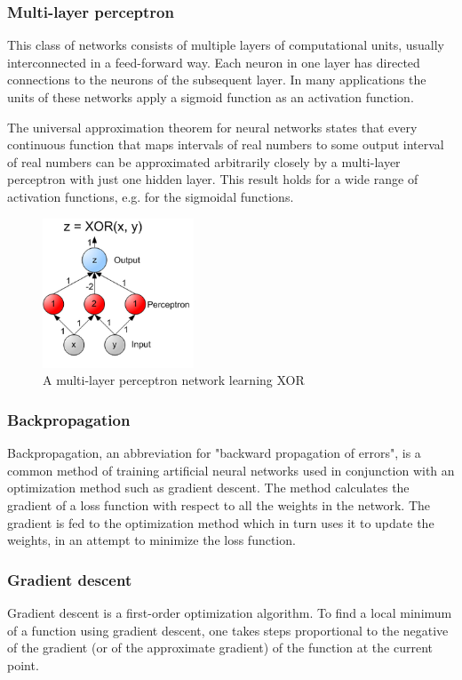 \documentclass[14pt,a4paper]{extarticle}
\begin{document}
		
		\subsubsection{Multi-layer perceptron}
		This class of networks consists of multiple layers of computational units, usually interconnected in a feed-forward way. Each neuron in one layer has directed connections to the neurons of the subsequent layer. In many applications the units of these networks apply a sigmoid function as an activation function.

The universal approximation theorem for neural networks states that every continuous function that maps intervals of real numbers to some output interval of real numbers can be approximated arbitrarily closely by a multi-layer perceptron with just one hidden layer. This result holds for a wide range of activation functions, e.g. for the sigmoidal functions.

		\begin{figure}[H]
			\includegraphics[width=0.4\textwidth, center]{XOR_perceptron_net.png}
			\caption{A multi-layer perceptron network learning XOR}
		\end{figure}
		
		
	\subsubsection{Backpropagation}
	
	Backpropagation, an abbreviation for "backward propagation of errors", is a common method of training artificial neural networks used in conjunction with an optimization method such as gradient descent. The method calculates the gradient of a loss function with respect to all the weights in the network. The gradient is fed to the optimization method which in turn uses it to update the weights, in an attempt to minimize the loss function.
	
	\subsubsection{Gradient descent}
	Gradient descent is a first-order optimization algorithm. To find a local minimum of a function using gradient descent, one takes steps proportional to the negative of the gradient (or of the approximate gradient) of the function at the current point.
\end{document}
